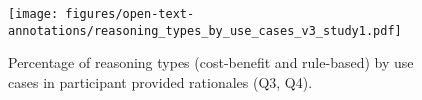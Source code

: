 \begin{figure}[!hptb]
    \centering
    \texttt{[image: figures/open-text-annotations/reasoning\_types\_by\_use\_cases\_v3\_study1.pdf]}
    \caption{Percentage of reasoning types (cost-benefit and rule-based) by use cases in participant provided rationales (Q3, Q4).}
    \label{fig:reasoning-types-percentage}
\end{figure}